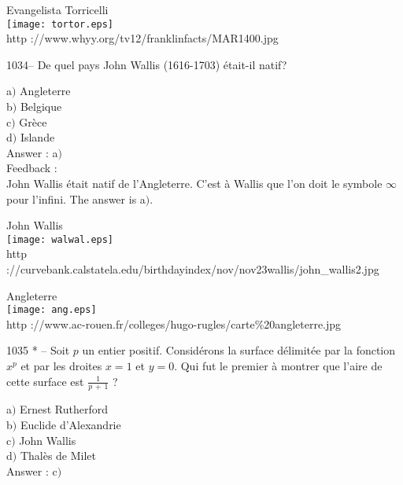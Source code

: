 \documentclass[letterpaper, 12pt]{article}
\begin{document}
        \begin{center}
        Evangelista Torricelli\\
    \texttt{[image: tortor.eps]}\\
        {\footnotesize http ://www.whyy.org/tv12/franklinfacts/MAR1400.jpg}
    \end{center}

1034-- De quel pays John Wallis (1616-1703) \'etait-il natif?

a$)$ Angleterre \\
b$)$ Belgique \\
c$)$ Gr\`ece  \\
d$)$ Islande \\

Answer : a$)$\\

Feedback :\\
John Wallis \'etait natif de l'Angleterre. C'est \`a Wallis que l'on
doit le symbole $\infty$ pour l'infini.
The answer is a$)$.\\

        \begin{center}
        John Wallis\\[2mm]
    \texttt{[image: walwal.eps]}\\
        {\footnotesize http
://curvebank.calstatela.edu/birthdayindex/nov/nov23wallis/john\_wallis2.jpg}
    \end{center}

        \begin{center}
        Angleterre\\
    \texttt{[image: ang.eps]}\\
        {\footnotesize http
://www.ac-rouen.fr/colleges/hugo-rugles/carte\%20angleterre.jpg}
    \end{center}

1035 * -- Soit $p$ un entier positif. Consid\'erons la surface
d\'elimit\'ee par la fonction $x^p$ et par les droites $x=1$ et
$y=0$. Qui fut le premier \`a montrer que l'aire de cette surface
est $\frac1{p\,+\,1}$ ?

a$)$ Ernest Rutherford \\
b$)$ Euclide d'Alexandrie  \\
c$)$ John Wallis  \\
d$)$ Thal\`es de Milet \\

Answer : c$)$\\
\end{document}
